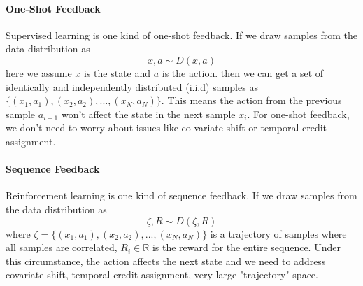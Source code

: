 \documentclass[11pt]{article}
\begin{document}
\paragraph{One-Shot Feedback}
Supervised learning is one kind of one-shot feedback. If we draw samples from the data distribution as 
\begin{equation}
    x, a \sim \mathit{D} (x, a)
\end{equation}
here we assume $x$ is the state and $a$ is the action. then we can get a set of identically and independently distributed (i.i.d) samples as $\{(x_1, a_1), (x_2, a_2), ..., (x_N, a_N)\}$. This means the action from the previous sample $a_{i-1}$ won't affect the state in the next sample $x_{i}$. For one-shot feedback, we don't need to worry about issues like co-variate shift or temporal credit assignment.
\paragraph{Sequence Feedback}
Reinforcement learning is one kind of sequence feedback. If we draw samples from the data distribution as 
\begin{equation}
    \zeta, R \sim \mathit{D} (\zeta, R)
\end{equation}
where $\zeta = \{(x_1, a_1), (x_2, a_2), ..., (x_N, a_N)\}$ is a trajectory of samples where all samples are correlated, $R_i \in \mathbb{R}$ is the reward for the entire sequence. Under this circumstance, the action affects the next state and we need to address covariate shift, temporal credit assignment, very large "trajectory" space.
\end{document}
